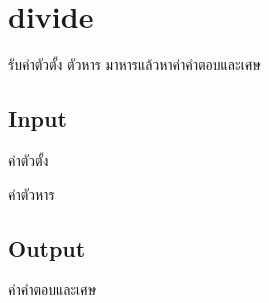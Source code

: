 \documentclass{article}
\begin{document}
\section*{divide}

รับค่าตัวตั้ง ตัวหาร มาหารแล้วหาค่าคำตอบและเศษ\\



\subsection*{Input}
{ค่าตัวตั้ง}



{ค่าตัวหาร}\\



\subsection*{Output}
{ค่าคำตอบและเศษ}\\
\end{document}
